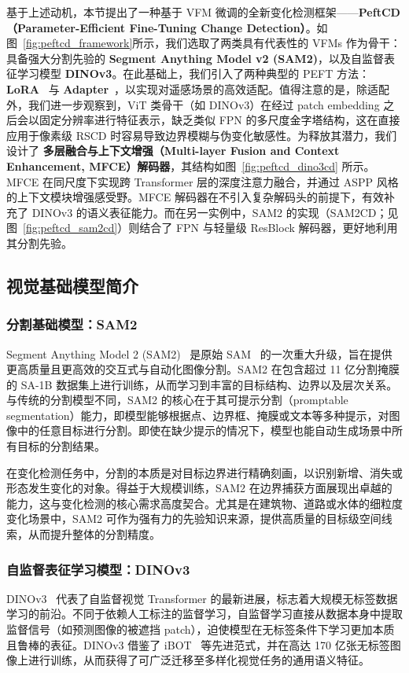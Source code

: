 基于上述动机，本节提出了一种基于 VFM 微调的全新变化检测框架——\textbf{PeftCD（Parameter-Efficient Fine-Tuning Change Detection）}。如图~\ref{fig:peftcd_framework}所示，我们选取了两类具有代表性的 VFMs 作为骨干：具备强大分割先验的 \textbf{Segment Anything Model v2 (SAM2)}，以及自监督表征学习模型 \textbf{DINOv3}。在此基础上，我们引入了两种典型的 PEFT 方法：\textbf{LoRA}~\cite{LORA} 与 \textbf{Adapter}~\cite{adapter}，以实现对遥感场景的高效适配。值得注意的是，除适配外，我们进一步观察到，ViT 类骨干（如 DINOv3）在经过 patch embedding 之后会以固定分辨率进行特征表示，缺乏类似 FPN 的多尺度金字塔结构，这在直接应用于像素级 RSCD 时容易导致边界模糊与伪变化敏感性。为释放其潜力，我们设计了 \textbf{多层融合与上下文增强（Multi-layer Fusion and Context Enhancement, MFCE）解码器}，其结构如图~\ref{fig:peftcd_dino3cd} 所示。MFCE 在同尺度下实现跨 Transformer 层的深度注意力融合，并通过 ASPP 风格的上下文模块增强感受野。MFCE 解码器在不引入复杂解码头的前提下，有效补充了 DINOv3 的语义表征能力。而在另一实例中，SAM2 的实现（SAM2CD；见图~\ref{fig:peftcd_sam2cd}）则结合了 FPN 与轻量级 ResBlock 解码器，更好地利用其分割先验。

\subsection{视觉基础模型简介}

\subsubsection{分割基础模型：SAM2}
Segment Anything Model 2 (SAM2)~\cite{ravi2024sam} 是原始 SAM~\cite{Kirillov2023SegmentA} 的一次重大升级，旨在提供更高质量且更高效的交互式与自动化图像分割。SAM2 在包含超过 11 亿分割掩膜的 SA-1B 数据集上进行训练，从而学习到丰富的目标结构、边界以及层次关系。与传统的分割模型不同，SAM2 的核心在于其可提示分割（promptable segmentation）能力，即模型能够根据点、边界框、掩膜或文本等多种提示，对图像中的任意目标进行分割。即使在缺少提示的情况下，模型也能自动生成场景中所有目标的分割结果。

在变化检测任务中，分割的本质是对目标边界进行精确刻画，以识别新增、消失或形态发生变化的对象。得益于大规模训练，SAM2 在边界捕获方面展现出卓越的能力，这与变化检测的核心需求高度契合。尤其是在建筑物、道路或水体的细粒度变化场景中，SAM2 可作为强有力的先验知识来源，提供高质量的目标级空间线索，从而提升整体的分割精度。

\subsubsection{自监督表征学习模型：DINOv3}
DINOv3~\cite{simeoni2025dinov3} 代表了自监督视觉 Transformer 的最新进展，标志着大规模无标签数据学习的前沿。不同于依赖人工标注的监督学习，自监督学习直接从数据本身中提取监督信号（如预测图像的被遮挡 patch），迫使模型在无标签条件下学习更加本质且鲁棒的表征。DINOv3 借鉴了 iBOT~\cite{Zhou2021iBOTIB} 等先进范式，并在高达 170 亿张无标签图像上进行训练，从而获得了可广泛迁移至多样化视觉任务的通用语义特征。

